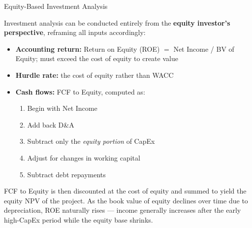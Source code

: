 \documentclass[10pt]{article}
\begin{document}
    \begin{core}{Equity-Based Investment Analysis}

      Investment analysis can be conducted entirely from the \textbf{equity investor's perspective}, reframing all inputs accordingly:

      \begin{itemize}

        \item \textbf{Accounting return:} Return on Equity (ROE) $=$ Net Income / BV of Equity; must exceed the cost of equity to create value

        \item \textbf{Hurdle rate:} the cost of equity rather than WACC

        \item \textbf{Cash flows:} FCF to Equity, computed as:
        \begin{enumerate}
          \item Begin with Net Income
          \item Add back D\&A
          \item Subtract only the \textit{equity portion} of CapEx
          \item Adjust for changes in working capital
          \item Subtract debt repayments
        \end{enumerate}

      \end{itemize}

      FCF to Equity is then discounted at the cost of equity and summed to yield the equity NPV of the project. As the book value of equity declines over time due to depreciation, ROE naturally rises — income generally increases after the early high-CapEx period while the equity base shrinks.


    \end{core}
\end{document}
